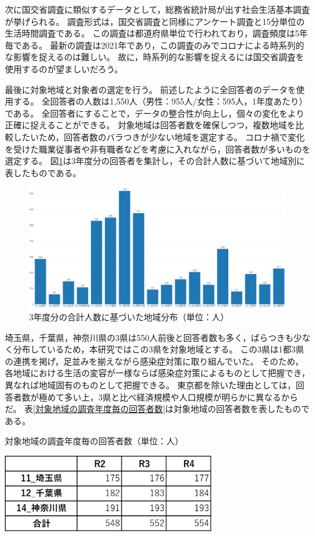 \documentclass[paper={210mm,297mm},fontsize=15Q,line_length=35zw,number_of_lines=31,head_space=30mm,gutter=40mm,baselineskip=2.0zw,headfoot_verticalposition=1.5zw]{jlreq}
\begin{document}
次に国交省調査に類似するデータとして，総務省統計局が出す社会生活基本調査が挙げられる。
調査形式は，国交省調査と同様にアンケート調査と15分単位の生活時間調査である。
この調査は都道府県単位で行われており，調査頻度は5年毎である。
最新の調査は2021年であり，この調査のみでコロナによる時系列的な影響を捉えるのは難しい。
故に，時系列的な影響を捉えるには国交省調査を使用するのが望ましいだろう。

最後に対象地域と対象者の選定を行う。
前述したように全回答者のデータを使用する。
全回答者の人数は1,550人（男性：955人/女性：595人，1年度あたり）である。
全回答者にすることで，データの整合性が向上し，個々の変化をより正確に捉えることができる。
対象地域は回答者数を確保しつつ，複数地域を比較したいため，回答者数のバラつきが少ない地域を選定する。
コロナ禍で変化を受けた職業従事者や非有職者などを考慮に入れながら，回答者数が多いものを選定する。
図\ref{3年度分の合計人数に基づいた地域分布}は3年度分の回答者を集計し，その合計人数に基づいて地域別に表したものである。

\begin{figure}[H]
  \centering
  \includegraphics[width=120mm]{../Figure/c02s01_fig_3年度分の合計人数に基づいた地域分布.png}
  \caption{3年度分の合計人数に基づいた地域分布（単位：人）} %
  \label{3年度分の合計人数に基づいた地域分布}
\end{figure}

埼玉県，千葉県，神奈川県の3県は550人前後と回答者数も多く，ばらつきも少なく分布しているため，本研究ではこの3県を対象地域とする。
この3県は1都3県の連携を掲げ，足並みを揃えながら感染症対策に取り組んでいた。
そのため，各地域における生活の変容が一様ならば感染症対策によるものとして把握でき，異なれば地域固有のものとして把握できる。
東京都を除いた理由としては，回答者数が極めて多い上，3県と比べ経済規模や人口規模が明らかに異なるからだ。
表\ref{対象地域の調査年度毎の回答者数}は対象地域の回答者数を表したものである。

\begin{table}[H]
  \centering
  \caption{対象地域の調査年度毎の回答者数（単位：人）} %
  \includegraphics[width=90mm]{../Figure/c02s01_table_対象地域の調査年度ごとの回答者数.png}
  \label{対象地域の調査年度毎の回答者数}
\end{table}
\end{document}
